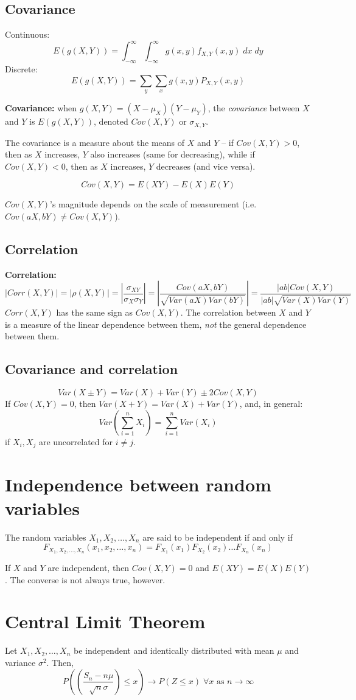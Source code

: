 \documentclass[15pt]{article}
\begin{document}
\subsection{Covariance}
Continuous:
\[
    E(g(X,Y)) = \int_{-\infty}^{\infty} \int_{-\infty}^{\infty} g(x,y) f_{X,Y} (x,y) \; dx \; dy
\]
Discrete:
\[
    E(g(X,Y)) = \sum_y \sum_x g(x,y) P_{X,Y} (x,y)
\]

\textbf{Covariance:} when $g(X,Y) = (X - \mu_X) (Y - \mu_Y)$, the \emph{covariance} between $X$ and $Y$ is $E(g(X,Y))$, denoted $Cov(X,Y)$ or $\sigma_{X,Y}$.

The covariance is a measure about the means of $X$ and $Y$ -- if $Cov(X,Y) > 0$, then as $X$ increases, $Y$ also increases (same for decreasing), while if $Cov(X,Y) < 0$, then as $X$ increases, $Y$ decreases (and vice versa).

\[
    Cov(X,Y) = E(XY) - E(X)E(Y)
\]

$Cov(X,Y)$'s magnitude depends on the scale of measurement (i.e. $Cov(aX, bY) \neq Cov(X,Y)$).

\subsection{Correlation}
\textbf{Correlation:} 
\[
    |Corr(X,Y)| = |\rho(X,Y)| = \left|\frac{\sigma_{XY}}{\sigma_X \sigma_Y}\right| = \left|\frac{Cov(aX,bY)}{\sqrt{Var(aX) Var(bY)}}\right| = \frac{|ab| Cov(X,Y)}{|ab| \sqrt{Var(X) Var(Y)}}
\]
$Corr(X,Y)$ has the same sign as $Cov(X,Y)$. The correlation between $X$ and $Y$ is a measure of the linear dependence between them, \emph{not} the general dependence between them.

\subsection{Covariance and correlation}
\[
    Var(X \pm Y) = Var(X) + Var(Y) \pm 2 Cov(X,Y)
\]
If $Cov(X,Y) = 0$, then $Var(X + Y) = Var(X) + Var(Y)$, and, in general:
\[
    Var\left(\sum_{i=1}^n X_i\right) = \sum_{i=1}^n Var(X_i)
\]
if $X_i, X_j$ are uncorrelated for $i \neq j$.

\section{Independence between random variables}
The random variables $X_1, X_2, \dots, X_n$ are said to be independent if and only if
\[
    F_{X_1, X_2, \dots, X_n} (x_1, x_2, \dots, x_n) = F_{X_1} (x_1) F_{X_2} (x_2) \dots F_{X_n} (x_n)
\]

If $X$ and $Y$ are independent, then $Cov(X,Y) = 0$ and $E(XY) = E(X) E(Y)$. The converse is not always true, however. 

\section{Central Limit Theorem}
Let $X_1, X_2, \dots, X_n$ be independent and identically distributed with mean $\mu$ and variance $\sigma^2$. Then,
\[
    P\left(\left(\frac{S_n - n \mu}{\sqrt{n} \sigma}\right) \leq x\right) \rightarrow P(Z \leq x) \; \forall x \text{ as } n \rightarrow \infty
\]
\end{document}
